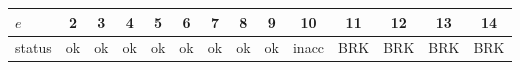 \begin{tabular}{lccccccccccccc}
\toprule
$e$ & 2 & 3 & 4 & 5 & 6 & 7 & 8 & 9 & 10 & 11 & 12 & 13 & 14\\
\midrule
status & \cellcolor{green!15}ok & \cellcolor{green!15}ok & \cellcolor{green!15}ok & \cellcolor{green!15}ok & \cellcolor{green!15}ok & \cellcolor{green!15}ok & \cellcolor{green!15}ok & \cellcolor{green!15}ok & \cellcolor{orange!30}inacc & \cellcolor{red!25}BRK & \cellcolor{red!25}BRK & \cellcolor{red!25}BRK & \cellcolor{red!25}BRK\\
\bottomrule
\end{tabular}
